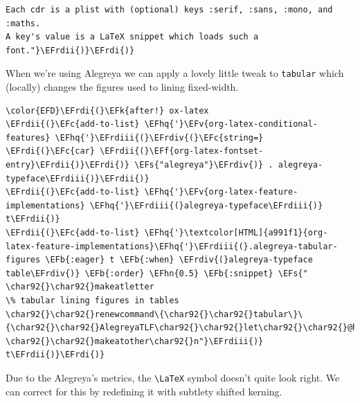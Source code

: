 \documentclass{scrartcl}
\newcommand{\EFk}[1]{\textcolor{EFk}{#1}} %
\newcommand{\EFs}[1]{\textcolor{EFs}{#1}} %
\newcommand{\EFb}[1]{\textcolor{EFb}{#1}} %
\newcommand{\EFc}[1]{\textcolor{EFc}{#1}} %
\newcommand{\EFv}[1]{\textcolor{EFv}{#1}} %
\newcommand{\EFf}[1]{\textcolor{EFf}{#1}} %
\newcommand{\EFhn}[1]{#1} %
\newcommand{\EFhq}[1]{#1} %
\newcommand{\EFrdi}[1]{#1} %
\newcommand{\EFrdii}[1]{#1} %
\newcommand{\EFrdiii}[1]{#1} %
\newcommand{\EFrdiv}[1]{#1} %
\begin{document}
\begin{Code}
\begin{Verbatim}[]
Each cdr is a plist with (optional) keys :serif, :sans, :mono, and :maths.
A key's value is a LaTeX snippet which loads such a font."}\EFrdii{)}\EFrdi{)}
\end{Verbatim}
\end{Code}

When we're using Alegreya we can apply a lovely little tweak to \texttt{tabular} which
(locally) changes the figures used to lining fixed-width.

\begin{Code}
\begin{Verbatim}[]
\color{EFD}\EFrdi{(}\EFk{after!} ox-latex
\EFrdii{(}\EFc{add-to-list} \EFhq{'}\EFv{org-latex-conditional-features} \EFhq{'}\EFrdiii{(}\EFrdiv{(}\EFc{string=} \EFrdi{(}\EFc{car} \EFrdii{(}\EFf{org-latex-fontset-entry}\EFrdii{)}\EFrdi{)} \EFs{"alegreya"}\EFrdiv{)} . alegreya-typeface\EFrdiii{)}\EFrdii{)}
\EFrdii{(}\EFc{add-to-list} \EFhq{'}\EFv{org-latex-feature-implementations} \EFhq{'}\EFrdiii{(}alegreya-typeface\EFrdiii{)} t\EFrdii{)}
\EFrdii{(}\EFc{add-to-list} \EFhq{'}\textcolor[HTML]{a991f1}{org-latex-feature-implementations}\EFhq{'}\EFrdiii{(}.alegreya-tabular-figures \EFb{:eager} t \EFb{:when} \EFrdiv{(}alegreya-typeface table\EFrdiv{)} \EFb{:order} \EFhn{0.5} \EFb{:snippet} \EFs{"
\char92{}\char92{}makeatletter
\% tabular lining figures in tables
\char92{}\char92{}renewcommand\{\char92{}\char92{}tabular\}\{\char92{}\char92{}AlegreyaTLF\char92{}\char92{}let\char92{}\char92{}@halignto\char92{}\char92{}@empty\char92{}\char92{}@tabular\}
\char92{}\char92{}makeatother\char92{}n"}\EFrdiii{)} t\EFrdii{)}\EFrdi{)}
\end{Verbatim}
\end{Code}

Due to the Alegreya's metrics, the \texttt{\textbackslash{}LaTeX} symbol doesn't quite look right. We
can correct for this by redefining it with subtlety shifted kerning.
\end{document}
